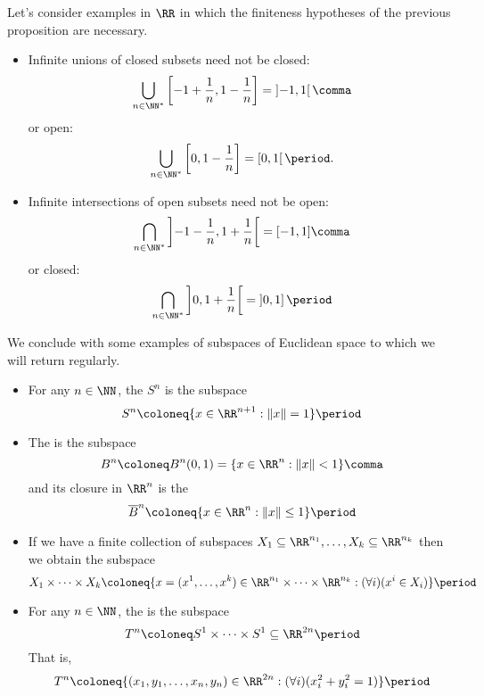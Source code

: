 \begin{exm}
	Let's consider examples in $\RR$ in which the finiteness hypotheses of the previous proposition are necessary.
	\begin{itemize}
		\item Infinite unions of closed subsets need not be closed:
			\[
				\bigcup_{n\in\NN^{\ast}} \left[-1+\frac{1}{n}, 1-\frac{1}{n}\right] = \left]-1,1\right[ \comma
			\]
			or open:
			\[
				\bigcup_{n\in\NN^{\ast}} \left[0,1-\frac{1}{n}\right] = \left[0,1\right[ \period.
			\]
		\item Infinite intersections of open subsets need not be open:
			\[
				\bigcap_{n\in\NN^{\ast}} \left]-1-\frac{1}{n}, 1+\frac{1}{n}\right[ = [-1,1] \comma
			\]
			or closed:
			\[
				\bigcap_{n\in\NN^{\ast}} \left]0, 1+\frac{1}{n}\right[ = \left]0,1\right] \period
			\]
	\end{itemize}
\end{exm}

We conclude with some examples of subspaces of Euclidean space to which we will return regularly.

\begin{exm}
	\begin{itemize}
		\item For any $n \in \NN$, the  $S^n$ is the subspace
			\[
				S^n \coloneq \{ x \in \RR^{n+1} : \|x\| = 1 \} \period
			\]
		\item The  is the subspace
			\[
				B^n \coloneq B^n(0,1) = \{ x \in \RR^n : \| x \| < 1 \} \comma
			\]
			and its closure in $\RR^n$ is the 
			\[
				\overline{B}^n \coloneq \{ x \in \RR^n : \| x \| \leq 1 \} \period
			\]
		\item If we have a finite collection of subspaces $X_1 \subseteq \RR^{n_1}, \dots, X_k \subseteq \RR^{n_k} $ then we obtain the subspace
			\[
				X_1 \times \cdots \times X_k \coloneq \{ x = (x^1, \dots, x^k) \in \RR^{n_1} \times \cdots \times \RR^{n_k} : (\forall i)(x^i \in X_i) \} \period
			\]
		\item For any $ n\in \NN $, the  is the subspace
			\[
				T^n \coloneq S^1 \times \cdots \times S^1 \subseteq \RR^{2n} \period
			\]
			That is,
			\[
				T^n \coloneq \{ (x_1, y_1, \dots, x_n, y_n) \in \RR^{2n} : (\forall i)(x_i^2 +y_i^2=1) \} \period
			\]
	\end{itemize}
\end{exm}

